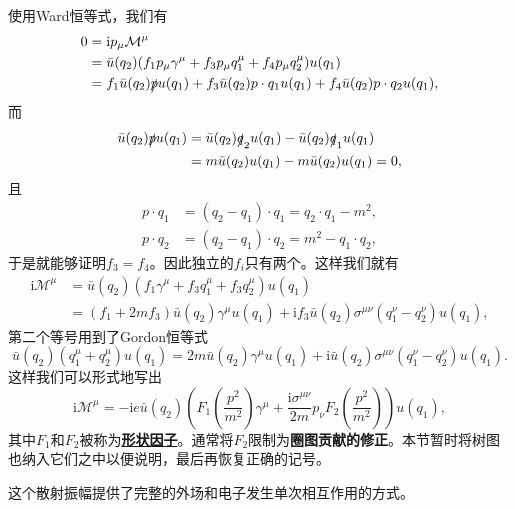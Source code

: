 \documentclass[hyperref, UTF8, a4paper]{ctexart}
\newcommand*{\ii}{\mathrm{i}}
\newcommand{\concept}[1]{\underline{\textbf{#1}}}
\renewcommand{\emph}{\textbf}
\begin{document}
使用Ward恒等式，我们有
\[
    \begin{aligned}
        0 &= \ii p_\mu \mathcal{M}^\mu \\
        &= \bar{u}(q_2) (f_1 p_\mu \gamma^\mu + f_3 p_\mu q_1^\mu + f_4 p_\mu q_2^\mu) u(q_1) \\
        &= f_1 \bar{u}(q_2) \slashed{p} u(q_1) + f_3 \bar{u}(q_2) p \cdot q_1 {u}(q_1) + f_4 \bar{u}(q_2) p \cdot q_2 u(q_1),
    \end{aligned}
\]
而
\[
    \begin{aligned}
        \bar{u}(q_2) \slashed{p} u(q_1) &= \bar{u}(q_2) \slashed{q}_2 u(q_1) - \bar{u}(q_2) \slashed{q}_1 u(q_1) \\
        &= m \bar{u}(q_2) u(q_1) - m \bar{u}(q_2) u(q_1) = 0,
    \end{aligned}
\]
且
\[
    \begin{aligned}
        p \cdot q_1 &= (q_2 - q_1) \cdot q_1 = q_2 \cdot q_1 - m^2, \\
        p \cdot q_2 &= (q_2 - q_1) \cdot q_2 = m^2 - q_1 \cdot q_2,
    \end{aligned}
\]
于是就能够证明$f_3=f_4$。因此独立的$f_i$只有两个。这样我们就有
\[
    \begin{aligned}
        \ii \mathcal{M}^\mu &= \bar{u}(q_2) (f_1 \gamma^\mu + f_3 q_1^\mu + f_3 q_2^\mu) u(q_1) \\
        &= (f_1 + 2m f_3) \bar{u}(q_2) \gamma^\mu u(q_1) + \ii f_3 \bar{u}(q_2) \sigma^{\mu \nu} (q_1^\nu - q_2^\nu) u(q_1), 
    \end{aligned}
\]
第二个等号用到了Gordon恒等式
\[
    \bar{u}(q_2) (q_1^\mu + q_2^\mu) u(q_1) = 2m \bar{u}(q_2) \gamma^\mu u(q_1) + \ii \bar{u}(q_2) \sigma^{\mu \nu} (q_1^\nu - q_2^\nu) u(q_1).
\]
这样我们可以形式地写出
\begin{equation}
    \ii \mathcal{M}^\mu = -\ii e \bar{u}(q_2) \left( F_1\left(\frac{p^2}{m^2}\right) \gamma^\mu + \frac{\ii \sigma^{\mu \nu}}{2m} p_\nu F_2\left(\frac{p^2}{m^2}\right) \right) u(q_1),
    \label{eq:form-factor-vertex}
\end{equation}
其中$F_1$和$F_2$被称为\concept{形状因子}。通常将$F_2$限制为\emph{圈图贡献的修正}。本节暂时将树图也纳入它们之中以便说明，最后再恢复正确的记号。

这个散射振幅提供了完整的外场和电子发生单次相互作用的方式。
\end{document}
